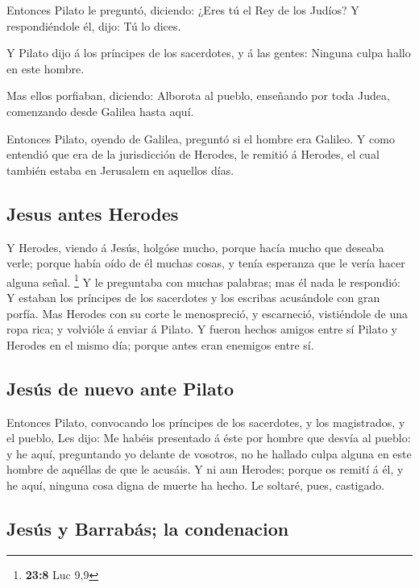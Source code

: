  Entonces Pilato le preguntó, diciendo: ¿Eres tú el Rey de
los Judíos? Y respondiéndole él, dijo: Tú lo dices.

 Y Pilato dijo á los príncipes de los sacerdotes, y á las
gentes: Ninguna culpa hallo en este hombre.

 Mas ellos porfiaban, diciendo: Alborota al pueblo,
enseñando por toda Judea, comenzando desde Galilea hasta aquí.

 Entonces Pilato, oyendo de Galilea, preguntó si el hombre
era Galileo.  Y como entendió que era de la jurisdicción
de Herodes, le remitió á Herodes, el cual también estaba en Jerusalem en
aquellos días.

\hypertarget{jesus-antes-herodes}{%
\subsection{Jesus antes Herodes}\label{jesus-antes-herodes}}

 Y Herodes, viendo á Jesús, holgóse mucho, porque hacía
mucho que deseaba verle; porque había oído de él muchas cosas, y tenía
esperanza que le vería hacer alguna señal. \footnote{\textbf{23:8} Luc
  9,9}  Y le preguntaba con muchas palabras; mas él nada
le respondió:  Y estaban los príncipes de los sacerdotes
y los escribas acusándole con gran porfía.  Mas Herodes
con su corte le menospreció, y escarneció, vistiéndole de una ropa rica;
y volvióle á enviar á Pilato.  Y fueron hechos amigos
entre sí Pilato y Herodes en el mismo día; porque antes eran enemigos
entre sí.

\hypertarget{jesuxfas-de-nuevo-ante-pilato}{%
\subsection{Jesús de nuevo ante
Pilato}\label{jesuxfas-de-nuevo-ante-pilato}}

 Entonces Pilato, convocando los príncipes de los
sacerdotes, y los magistrados, y el pueblo,  Les dijo: Me
habéis presentado á éste por hombre que desvía al pueblo: y he aquí,
preguntando yo delante de vosotros, no he hallado culpa alguna en este
hombre de aquéllas de que le acusáis.  Y ni aun Herodes;
porque os remití á él, y he aquí, ninguna cosa digna de muerte ha hecho.
 Le soltaré, pues, castigado.

\hypertarget{jesuxfas-y-barrabuxe1s-la-condenacion}{%
\subsection{Jesús y Barrabás; la
condenacion}\label{jesuxfas-y-barrabuxe1s-la-condenacion}}


